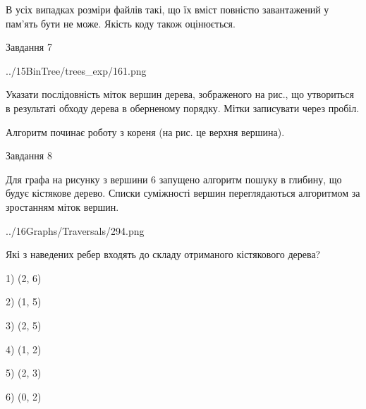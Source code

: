 \documentclass[12pt, ukrainian]{article}
\begin{document}
{В усіх випадках розміри файлів такі, що їх вміст повністю завантажений у пам'ять бути не може. Якість коду також оцінюється.



\vspace{10mm}\par

\newpage
\begin{minipage}[t]{9.7cm}
               
{\begin{center}Завдання {7}\end{center}}
\vspace{-4mm}

\begin{center}
	{../15BinTree/trees_exp/161.png}
\end{center}
Указати послідовність міток вершин дерева, зображеного на рис., що утвориться в результаті обходу дерева в оберненому порядку. Мітки записувати через пробіл.\par Алгоритм починає роботу з кореня (на рис. це верхня вершина).\par

\end{minipage}
\vline \hspace{8mm}
\begin{minipage}[t]{8.0cm}
               
{\begin{center}Завдання {8}\end{center}}
\vspace{-4mm}
Для графа на рисунку з вершини 6 запущено алгоритм пошуку в глибину, що будує кістякове дерево. Списки суміжності вершин переглядаються алгоритмом за зростанням міток вершин.\par
\begin{center}
	{../16Graphs/Traversals/294.png}
\end{center}
\par Які з наведених ребер входять до складу отриманого кістякового дерева?\par
1) (2, 6)\par
2) (1, 5)\par
3) (2, 5)\par
4) (1, 2)\par
5) (2, 3)\par
6) (0, 2)\par
{\vskip 15pt} \par


\end{minipage}}
\end{document}
